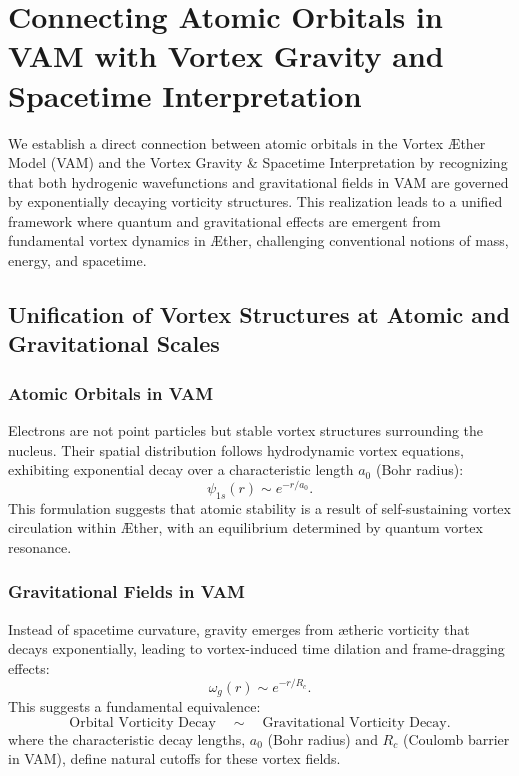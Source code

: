 
\section{Connecting Atomic Orbitals in VAM with Vortex Gravity and Spacetime Interpretation}


We establish a direct connection between atomic orbitals in the Vortex Æther Model (VAM) and the Vortex Gravity & Spacetime Interpretation by recognizing that both hydrogenic wavefunctions and gravitational fields in VAM are governed by exponentially decaying vorticity structures. This realization leads to a unified framework where quantum and gravitational effects are emergent from fundamental vortex dynamics in Æther, challenging conventional notions of mass, energy, and spacetime.


\subsection*{Unification of Vortex Structures at Atomic and Gravitational Scales}


\subsubsection*{Atomic Orbitals in VAM}
Electrons are not point particles but stable vortex structures surrounding the nucleus. Their spatial distribution follows hydrodynamic vortex equations, exhibiting exponential decay over a characteristic length $a_0$ (Bohr radius):
\begin{equation*}
\psi_{1s}(r) \sim e^{-r/a_0}.
\end{equation*}
This formulation suggests that atomic stability is a result of self-sustaining vortex circulation within Æther, with an equilibrium determined by quantum vortex resonance.


\subsubsection*{Gravitational Fields in VAM}
Instead of spacetime curvature, gravity emerges from ætheric vorticity that decays exponentially, leading to vortex-induced time dilation and frame-dragging effects:
\begin{equation*}
\omega_{g}(r) \sim e^{-r/R_c}.
\end{equation*}
This suggests a fundamental equivalence:
\begin{equation*}
\text{Orbital Vorticity Decay} \quad \sim \quad \text{Gravitational Vorticity Decay}.
\end{equation*}
where the characteristic decay lengths, $a_0$ (Bohr radius) and $R_c$ (Coulomb barrier in VAM), define natural cutoffs for these vortex fields.


